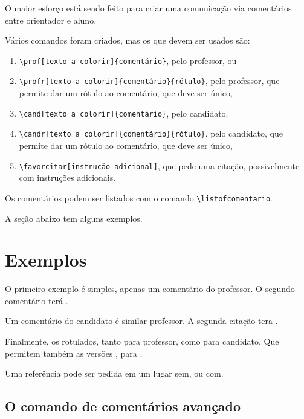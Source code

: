 \documentclass{article}
\begin{document}
O maior esforço está sendo feito para criar uma comunicação via comentários entre orientador e aluno. 

Vários comandos foram criados, mas os que devem ser usados são:
\begin{enumerate}
\item \verb!\prof[texto a colorir]{comentário}!, pelo professor, ou
\item \verb!\profr[texto a colorir]{comentário}{rótulo}!, pelo professor, que permite dar um rótulo ao comentário, que deve ser único, 
\item \verb!\cand[texto a colorir]{comentário}!, pelo candidato.
\item \verb!\candr[texto a colorir]{comentário}{rótulo}!, pelo candidato, que permite dar um rótulo ao comentário, que deve ser único, 
\item \verb!\favorcitar[instrução adicional]!, que pede uma citação, possivelmente com instruções adicionais.
\end{enumerate}

Os comentários podem ser listados com o comando \verb!\listofcomentario!.

A seção abaixo tem alguns exemplos.

\section{Exemplos}

O primeiro exemplo é simples, apenas um comentário do professor. O segundo comentário terá .

Um comentário do candidato é similar professor. A segunda citação tera .

Finalmente, os rotulados, tanto para professor, como para candidato. Que permitem também as versões , para .

Uma referência pode ser pedida em um lugar sem\favorcitar, ou com\favorcitar[o experimento].

\subsection{O comando de comentários avançado}
\end{document}
